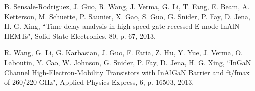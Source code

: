 \documentclass[journal]{IEEEtran}
\begin{document}
\begin{thebibliography}{00}
 B. Sensale-Rodriguez, J. Guo, R. Wang, J. Verma, G. Li, T. Fang, E. Beam, A. Ketterson, M. Schuette, P. Saunier, X. Gao, S. Guo, G. Snider, P. Fay, D. Jena, H. G. Xing, ``Time delay analysis in high speed gate-recessed E-mode InAlN HEMTs", Solid-State Electronics, 80, p. 67, 2013.

 R. Wang, G. Li, G. Karbasian, J. Guo, F. Faria, Z. Hu, Y. Yue, J. Verma, O. Laboutin, Y. Cao, W. Johnson, G. Snider, P. Fay, D. Jena, H. G. Xing, ``InGaN Channel High-Electron-Mobility Transistors with InAlGaN Barrier and ft/fmax of 260/220 GHz", Applied Physics Express, 6, p. 16503, 2013.

\end{thebibliography}
\end{document}
